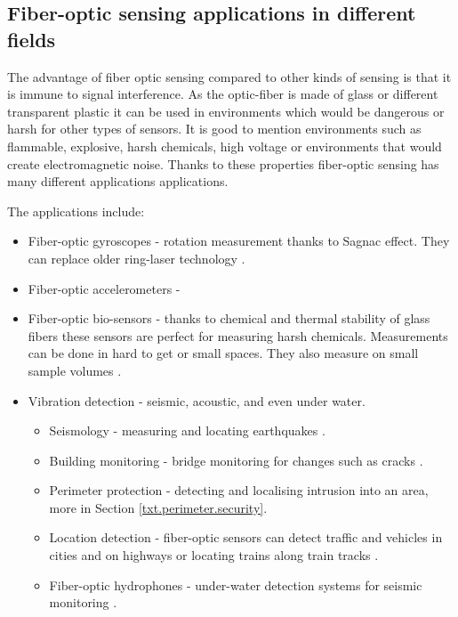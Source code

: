 \subsection{Fiber-optic sensing applications in different fields}\label{txt.sensing.usage}

The advantage of fiber optic sensing compared to other kinds of sensing is that it is immune to signal interference. As the optic-fiber is made of glass or different transparent plastic it can be used in environments which would be dangerous or harsh for other types of sensors. It is good to mention environments such as flammable, explosive, harsh chemicals, high voltage or environments that would create electromagnetic noise. Thanks to these properties fiber-optic sensing has many different applications applications.

The applications include:

\begin{itemize}
    \item Fiber-optic gyroscopes - rotation measurement thanks to Sagnac effect. They can replace older ring-laser technology \cite{fog}.
    \item Fiber-optic accelerometers - %
    \item Fiber-optic bio-sensors - thanks to chemical and thermal stability of glass fibers these sensors are perfect for measuring harsh chemicals. Measurements can be done in hard to get or small spaces. They also measure on small sample volumes \cite{chemsens}.
    \item Vibration detection - seismic, acoustic,  and even under water.
    \begin{itemize}
        \item Seismology - measuring and locating earthquakes \cite{dasKislov}.
        \item Building monitoring - bridge monitoring for changes such as cracks \cite{DVSShanFu}.
        \item Perimeter protection - detecting and localising intrusion into an area, more in Section \ref{txt.perimeter.security}.
        \item Location detection - fiber-optic sensors can detect traffic and vehicles in cities and on highways or locating trains along train tracks \cite{dasKislov}.
        \item Fiber-optic hydrophones - under-water detection systems for seismic monitoring \cite{hydrophones}.
    \end{itemize}
\end{itemize}



